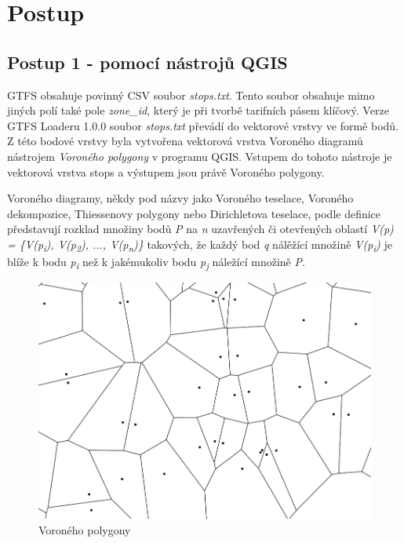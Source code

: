 \chapter{Postup}
\label{5-postup}



\section{Postup 1 - pomocí nástrojů QGIS}

GTFS obsahuje povinný CSV soubor \textit{stops.txt}. Tento soubor obsahuje mimo
jiných polí také pole \textit{zone\_id}, který je při tvorbě tarifních pásem klíčový.
Verze GTFS Loaderu 1.0.0 soubor \textit{stops.txt} převádí do vektorové vrstvy
ve formě bodů. Z této bodové vrstvy byla vytvořena vektorová vrstva Voroného 
diagramů nástrojem \textit{Voroného polygony} v programu QGIS.
Vstupem do tohoto nástroje je vektorová vrstva stops a výstupem jsou právě Voroného polygony.

Voroného diagramy, někdy pod názvy jako Voroného teselace, Voroného dekompozice,
Thiessenovy polygony nebo Dirichletova teselace, podle definice představují
rozklad množiny bodů \textit{P} na \textit{n} uzavřených či 
otevřených oblastí \textit{V(p) = \{V(p\textsubscript{i}), V(p\textsubscript{2}), ...,
V(p\textsubscript{n})\}} takových, že každý bod
\textit{q} nálěžící množině \textit{V(p\textsubscript{i})} je blíže k bodu
\textit{p\textsubscript{i}} než k jakémukoliv
bodu \textit{p\textsubscript{j}} náležící množině \textit{P}. \cite{bayer}

\begin{figure}[H] \centering
    \includegraphics[width=400pt]{./pictures/voronoi.png}
    \caption[Voroného polygony]{Voroného polygony}
	\label{fig:voronoi}              
\end{figure}     

